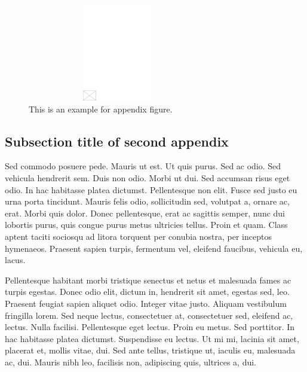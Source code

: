 \documentclass[AMS,STIX2COL]{WileyNJD-v2}
\begin{document}
    \begin{figure}[t]
        \centerline{\includegraphics[height=10pc,width=78mm,draft]{empty}}
        \caption{This is an example for appendix figure.\label{fig5}}
    \end{figure}

    \subsection{Subsection title of second appendix\label{app2.1a}}

    Sed commodo posuere pede. Mauris ut est. Ut quis purus. Sed ac odio. Sed vehicula hendrerit sem. Duis non odio.
    Morbi ut dui. Sed accumsan risus eget odio. In hac habitasse platea dictumst. Pellentesque non elit. Fusce sed justo
    eu urna porta tincidunt. Mauris felis odio, sollicitudin sed, volutpat a, ornare ac, erat. Morbi quis dolor. Donec
    pellentesque, erat ac sagittis semper, nunc dui lobortis purus, quis congue purus metus ultricies tellus. Proin et quam.
    Class aptent taciti sociosqu ad litora torquent per conubia nostra, per inceptos hymenaeos. Praesent sapien turpis,
    fermentum vel, eleifend faucibus, vehicula eu, lacus.

    Pellentesque habitant morbi tristique senectus et netus et malesuada fames ac turpis egestas. Donec odio elit,
    dictum in, hendrerit sit amet, egestas sed, leo. Praesent feugiat sapien aliquet odio. Integer vitae justo. Aliquam
    vestibulum fringilla lorem. Sed neque lectus, consectetuer at, consectetuer sed, eleifend ac, lectus. Nulla facilisi.
    Pellentesque eget lectus. Proin eu metus. Sed porttitor. In hac habitasse platea dictumst. Suspendisse eu lectus. Ut
    mi mi, lacinia sit amet, placerat et, mollis vitae, dui. Sed ante tellus, tristique ut, iaculis eu, malesuada ac, dui.
    Mauris nibh leo, facilisis non, adipiscing quis, ultrices a, dui.
\end{document}
